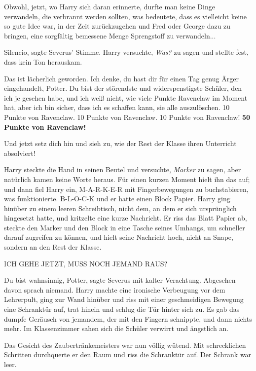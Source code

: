 Obwohl, jetzt, wo Harry sich daran erinnerte, durfte man keine Dinge verwandeln,
die verbrannt werden sollten, was bedeutete, dass es vielleicht keine so gute
Idee war, in der Zeit zurückzugehen und Fred oder George dazu zu bringen, eine
sorgfältig bemessene Menge Sprengstoff zu verwandeln...

\glqq{}Silencio\grqq{}, sagte Severus' Stimme. Harry versuchte, \glqq{}
\emph{Was?\grqq{}} zu sagen und stellte fest, dass kein Ton herauskam.

\glqq{}Das ist lächerlich geworden. Ich denke, du hast dir für einen Tag genug
Ärger eingehandelt, Potter. Du bist der störendste und widerspenstigste Schüler,
den ich je gesehen habe, und ich weiß nicht, wie viele Punkte Ravenclaw im
Moment hat, aber ich bin sicher, dass ich es schaffen kann, sie alle
auszulöschen. 10 Punkte von Ravenclaw. 10 Punkte von Ravenclaw. 10 Punkte von
Ravenclaw! \textbf{50 Punkte von Ravenclaw!}

Und jetzt setz dich hin und sieh zu, wie der Rest der Klasse ihren Unterricht
absolviert!\grqq{}

Harry steckte die Hand in seinen Beutel und versuchte, \glqq{}
\emph{Marker}\grqq{} zu sagen, aber natürlich kamen keine Worte heraus. Für
einen kurzen Moment hielt ihn das auf; und dann fiel Harry ein, M-A-R-K-E-R mit
Fingerbewegungen zu buchstabieren, was funktionierte. B-L-O-C-K und er hatte
einen Block Papier. Harry ging hinüber zu einem leeren Schreibtisch, nicht dem,
an dem er sich ursprünglich hingesetzt hatte, und kritzelte eine kurze
Nachricht. Er riss das Blatt Papier ab, steckte den Marker und den Block in eine
Tasche seines Umhangs, um schneller darauf zugreifen zu können, und hielt seine
Nachricht hoch, nicht an Snape, sondern an den Rest der Klasse.

ICH GEHE JETZT, MUSS NOCH JEMAND RAUS?

\glqq{}Du bist wahnsinnig, Potter\grqq{}, sagte Severus mit kalter Verachtung.
Abgesehen davon sprach niemand. Harry machte eine ironische Verbeugung vor dem
Lehrerpult, ging zur Wand hinüber und riss mit einer geschmeidigen Bewegung eine
Schranktür auf, trat hinein und schlug die Tür hinter sich zu. Es gab das dumpfe
Geräusch von jemandem, der mit den Fingern schnippte, und dann nichts mehr. Im
Klassenzimmer sahen sich die Schüler verwirrt und ängstlich an.

Das Gesicht des Zaubertränkemeisters war nun völlig wütend. Mit schrecklichen
Schritten durchquerte er den Raum und riss die Schranktür auf. Der Schrank war
leer.

